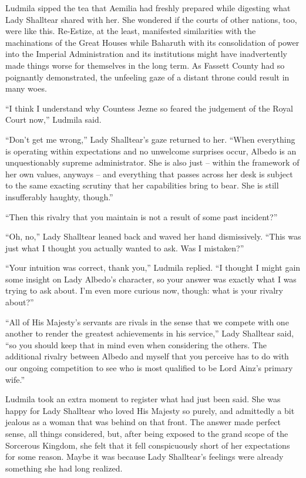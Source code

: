  

Ludmila sipped the tea that Aemilia had freshly prepared while digesting what Lady Shalltear shared with her. She wondered if the courts of other nations, too, were like this. Re-Estize, at the least, manifested similarities with the machinations of the Great Houses while Baharuth with its consolidation of power into the Imperial Administration and its institutions might have inadvertently made things worse for themselves in the long term. As Fassett County had so poignantly demonstrated, the unfeeling gaze of a distant throne could result in many woes.

 

“I think I understand why Countess Jezne so feared the judgement of the Royal Court now,” Ludmila said.

 

“Don’t get me wrong,” Lady Shalltear’s gaze returned to her. “When everything is operating within expectations and no unwelcome surprises occur, Albedo is an unquestionably supreme administrator. She is also just – within the framework of her own values, anyways – and everything that passes across her desk is subject to the same exacting scrutiny that her capabilities bring to bear. She is still insufferably haughty, though.”

 

“Then this rivalry that you maintain is not a result of some past incident?”

 

“Oh, no,” Lady Shalltear leaned back and waved her hand dismissively. “This was just what I thought you actually wanted to ask. Was I mistaken?”

 

“Your intuition was correct, thank you,” Ludmila replied. “I thought I might gain some insight on Lady Albedo’s character, so your answer was exactly what I was trying to ask about. I’m even more curious now, though: what is your rivalry about?”

 

“All of His Majesty’s servants are rivals in the sense that we compete with one another to render the greatest achievements in his service,” Lady Shalltear said, “so you should keep that in mind even when considering the others. The additional rivalry between Albedo and myself that you perceive has to do with our ongoing competition to see who is most qualified to be Lord Ainz’s primary wife.”

 

Ludmila took an extra moment to register what had just been said. She was happy for Lady Shalltear who loved His Majesty so purely, and admittedly a bit jealous as a woman that was behind on that front. The answer made perfect sense, all things considered, but, after being exposed to the grand scope of the Sorcerous Kingdom, she felt that it fell conspicuously short of her expectations for some reason. Maybe it was because Lady Shalltear’s feelings were already something she had long realized.

